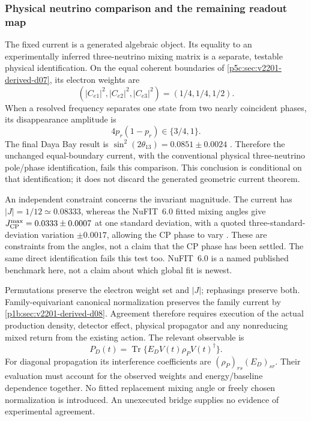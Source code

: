 \documentclass[12pt,a4paper]{article}
\begin{document}
\subsubsection{Physical neutrino comparison and the remaining readout map}
\label{p5c:sec:v2201-neutrino-observation-test}
The fixed current is a generated algebraic object. Its equality to an
experimentally inferred three-neutrino mixing matrix is a separate,
testable physical identification. On the equal coherent boundaries of
\ref{p5c:sec:v2201-derived-d07}, its electron weights are
\[
 (|C_{e1}|^2,|C_{e2}|^2,|C_{e3}|^2)=(1/4,1/4,1/2).
\]
When a resolved frequency separates one state from two nearly coincident
phases, its disappearance amplitude is
\[
 4p_r(1-p_r)\in\{3/4,1\}.
\]
The final Daya Bay result is $\sin^2(2\theta_{13})=0.0851\pm0.0024$
\cite{DayaBayFinal2023}. Therefore the unchanged equal-boundary current,
with the conventional physical three-neutrino pole/phase identification,
fails this comparison. This conclusion is conditional on that identification;
it does not discard the generated geometric current theorem.

An independent constraint concerns the invariant magnitude. The current has
$|J|=1/12\simeq0.08333$, whereas the NuFIT~6.0 fitted mixing angles give
$J_{\rm CP}^{\max}=0.0333\pm0.0007$ at one standard deviation, with a quoted
three-standard-deviation variation $\pm0.0017$, allowing the CP phase to
vary \cite{NuFIT2024}. These are constraints from the angles, not a claim
that the CP phase has been settled. The same direct identification fails
this test too. NuFIT~6.0 is a named published benchmark here, not a claim
about which global fit is newest.

Permutations preserve the electron weight set and $|J|$; rephasings
preserve both. Family-equivariant canonical normalization preserves the
family current by \ref{p1b:sec:v2201-derived-d08}. Agreement therefore
requires execution of the actual production density, detector effect,
physical propagator and any nonreducing mixed return from the existing
action. The relevant observable is
\[
 P_D(t)=\operatorname{Tr}\{E_DV(t)\rho_PV(t)^\dagger\}.
\]
For diagonal propagation its interference coefficients are
$(\rho_P)_{rs}(E_D)_{sr}$. Their evaluation must account for the observed
weights and energy/baseline dependence together. No fitted replacement
mixing angle or freely chosen normalization is introduced. An unexecuted
bridge supplies no evidence of experimental agreement.

\end{document}
